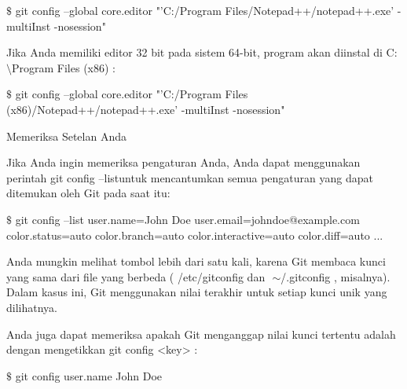 \vspace{12pt}
\noindent 
  $  \$  $ git config --global core.editor "'C:/Program Files/Notepad++/notepad++.exe' -multiInst -nosession"  \par
\vspace{12pt}
\noindent 
Jika Anda memiliki editor 32 bit pada sistem 64-bit, program akan diinstal di $  $C: $  \setminus  $Program Files (x86) $  $: \par
\vspace{12pt}
\noindent 
  $  \$  $ git config --global core.editor "'C:/Program Files (x86)/Notepad++/notepad++.exe' -multiInst -nosession"  \par
\noindent 
Memeriksa Setelan Anda \par
\vspace{12pt}
\noindent 
Jika Anda ingin memeriksa pengaturan Anda, Anda dapat menggunakan perintah $  $git config --listuntuk mencantumkan semua pengaturan yang dapat ditemukan oleh Git pada saat itu: \par
\vspace{12pt}
\noindent 
  $  \$  $ git config --list user.name=John Doe user.email=johndoe@example.com color.status=auto color.branch=auto color.interactive=auto color.diff=auto ...  \par
\vspace{12pt}
\noindent 
Anda mungkin melihat tombol lebih dari satu kali, karena Git membaca kunci yang sama dari file yang berbeda ( $  $/etc/gitconfig $  $dan $  $ $  \sim  $/.gitconfig $  $, misalnya). $  $Dalam kasus ini, Git menggunakan nilai terakhir untuk setiap kunci unik yang dilihatnya. \par
\vspace{12pt}
\noindent 
Anda juga dapat memeriksa apakah Git menganggap nilai kunci tertentu adalah dengan mengetikkan $  $git config <key> $  $: \par
\vspace{12pt}
\noindent 
  $  \$  $ git config user.name John Doe  \par
\vspace{12pt}
\vspace{12pt}
\vspace{12pt}


